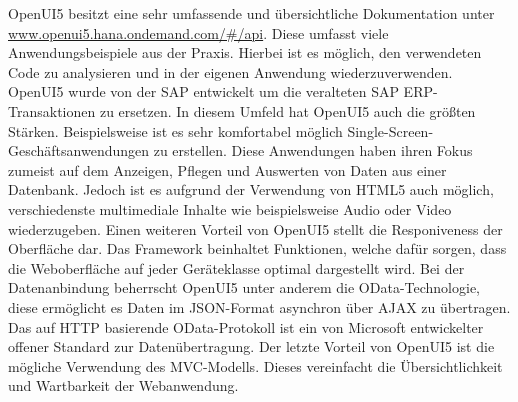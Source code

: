 OpenUI5 besitzt eine sehr umfassende und übersichtliche Dokumentation unter \url{www.openui5.hana.ondemand.com/#/api}. Diese umfasst viele Anwendungsbeispiele aus der Praxis. Hierbei ist es möglich, den verwendeten Code zu analysieren und in der eigenen Anwendung wiederzuverwenden. OpenUI5 wurde von der SAP entwickelt um die veralteten SAP ERP-Transaktionen zu ersetzen. In diesem Umfeld hat OpenUI5 auch die größten Stärken. Beispielsweise ist es sehr komfortabel möglich Single-Screen-Geschäftsanwendungen zu erstellen. Diese Anwendungen haben ihren Fokus zumeist auf dem Anzeigen, Pflegen und Auswerten von Daten aus einer Datenbank. Jedoch ist es aufgrund der Verwendung von HTML5 auch möglich, verschiedenste multimediale Inhalte wie beispielsweise Audio oder Video wiederzugeben. Einen weiteren Vorteil von OpenUI5 stellt die Responiveness der Oberfläche dar. Das Framework beinhaltet Funktionen, welche dafür sorgen, dass die Weboberfläche auf jeder Geräteklasse optimal dargestellt wird. Bei der Datenanbindung beherrscht OpenUI5 unter anderem die OData-Technologie, diese ermöglicht es Daten im JSON-Format asynchron über AJAX zu übertragen. Das auf HTTP basierende OData-Protokoll ist ein von Microsoft entwickelter offener Standard zur Datenübertragung. Der letzte Vorteil von OpenUI5 ist die mögliche Verwendung des MVC-Modells. Dieses vereinfacht die Übersichtlichkeit und Wartbarkeit der Webanwendung. 
